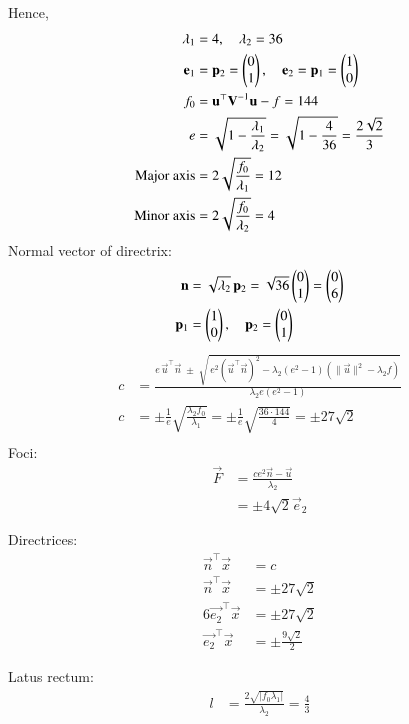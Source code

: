 \documentclass[journal]{article}
\begin{document}
Hence,
\begin{align}
\lambda_1 &= 4, \quad \lambda_2 = 36 \\
\mathbf{e}_1 &= \mathbf{p}_2 = \begin{pmatrix}0\\1\end{pmatrix}, \quad
\mathbf{e}_2 = \mathbf{p}_1 = \begin{pmatrix}1\\0\end{pmatrix}\\
f_0 &= \mathbf{u}^\top \mathbf{V}^{-1}\mathbf{u} - f = 144\\
e &= \sqrt{1-\frac{\lambda_1}{\lambda_2}}
= \sqrt{1-\frac{4}{36}}
= \frac{2\sqrt{2}}{3}\\
\text{Major axis} &= 2\sqrt{\frac{f_0}{\lambda_1}}
= 12 \\
\text{Minor axis} &= 2\sqrt{\frac{f_0}{\lambda_2}}
= 4
\end{align}
Normal vector of directrix:
\begin{align}
\mathbf{n} &= \sqrt{\lambda_2}\,\mathbf{p}_2 
= \sqrt{36}\begin{pmatrix}0\\1\end{pmatrix} 
= \begin{pmatrix}0\\6\end{pmatrix}\\
\mathbf{p}_1 &= \begin{pmatrix}1\\0\end{pmatrix}, \quad \mathbf{p}_2 = \begin{pmatrix}0\\1\end{pmatrix}
\end{align}
\begin{align}
c &= \frac{e\,\vec{u}^\top\vec{n} \;\pm\; 
\sqrt{\,e^{2}\left(\vec{u}^\top\vec{n}\right)^{2} 
- \lambda_{2}\left(e^{2}-1\right)\left(\|\vec{u}\|^{2}-\lambda_{2}f\right)}}{\lambda_{2}e\left(e^{2}-1\right)} \\[6pt]
c &= \pm\frac{1}{e}\sqrt{\frac{\lambda_2 f_0}{\lambda_1}}
= \pm\frac{1}{e}\sqrt{\frac{36\cdot144}{4}}
= \pm 27\sqrt{2} \\[6pt]
\end{align}
Foci:
\begin{align}
\vec{F} &= \frac{c e^2 \vec{n} - \vec{u}}{\lambda_2} \\
&= \pm 4\sqrt{2}\vec{e}_2
\end{align}

Directrices:
\begin{align}
\vec{n}^\top \vec{x} &= c \\
\vec{n}^\top \vec{x} &= \pm 27\sqrt{2}\\
6\vec{e_2}^\top \vec{x} &= \pm 27\sqrt{2}\\
\vec{e_2}^\top \vec{x} &= \pm \frac{9\sqrt{2}}{2}
\end{align}


Latus rectum:
\begin{align}
l &= \frac{2\sqrt{|f_0 \lambda_1|}}{\lambda_2}
= \frac{4}{3}
\end{align}
\end{document}
